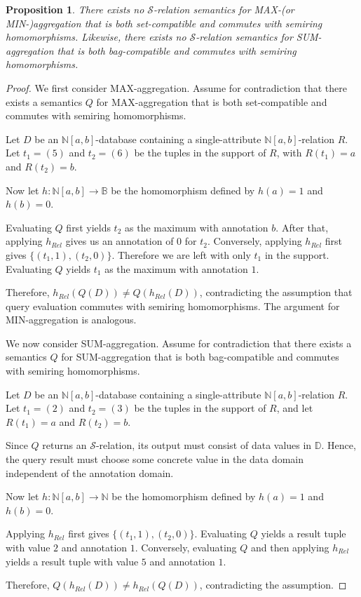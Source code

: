 \documentclass[oneside, 11pt]{amsbook}
\theoremstyle{plain}
\newtheorem{prop}[thm]{Proposition}
\theoremstyle{definition}
\theoremstyle{remark}
\begin{document}
\begin{prop}
    \label{prop:nosemanticsforaggregation}
    There exists no $\mathcal{S}$-relation semantics for MAX-(or MIN-)aggregation that is both set-compatible and commutes with semiring homomorphisms. Likewise, there exists no $\mathcal{S}$-relation semantics for SUM-aggregation that is both bag-compatible and commutes with semiring homomorphisms.
\end{prop}
\begin{proof}
    We first consider MAX-aggregation. Assume for contradiction that there exists a semantics $Q$ for MAX-aggregation that is both set-compatible and commutes with semiring homomorphisms.

    Let $D$ be an $\mathbb{N}[a,b]$-database containing a single-attribute $\mathbb{N}[a,b]$-relation $R$. Let $t_1=(5)$ and $t_2=(6)$ be the tuples in the support of $R$, with $R(t_1)=a$ and $R(t_2)=b$.

    Now let $h: \mathbb{N}[a,b] \to \mathbb{B}$ be the homomorphism defined by $h(a)=1$ and $h(b)=0$.

    Evaluating $Q$ first yields $t_2$ as the maximum with annotation $b$. After that, applying $h_{Rel}$ gives us an annotation of $0$ for $t_2$. Conversely, applying $h_{Rel}$ first gives $\{(t_1, 1), (t_2, 0)\}$. Therefore we are left with only $t_1$ in the support. Evaluating $Q$ yields $t_1$ as the maximum with annotation $1$.

    Therefore, $h_{Rel}(Q(D)) \neq Q(h_{Rel}(D))$, contradicting the assumption that query evaluation commutes with semiring homomorphisms. The argument for MIN-aggregation is analogous.

    We now consider SUM-aggregation. Assume for contradiction that there exists a semantics $Q$ for SUM-aggregation that is both bag-compatible and commutes with semiring homomorphisms.

    Let $D$ be an $\mathbb{N}[a,b]$-database containing a single-attribute $\mathbb{N}[a,b]$-relation $R$. Let $t_1=(2)$ and $t_2=(3)$ be the tuples in the support of $R$, and let $R(t_1)=a$ and $R(t_2)=b$.

    Since $Q$ returns an $\mathcal{S}$-relation, its output must consist of data values in $\mathbb{D}$. Hence, the query result must choose some concrete value in the data domain independent of the annotation domain.

    Now let $h: \mathbb{N}[a,b] \to \mathbb{N}$ be the homomorphism defined by $h(a)=1$ and $h(b)=0$.

    Applying $h_{Rel}$ first gives $\{(t_1, 1), (t_2, 0)\}$. Evaluating $Q$ yields a result tuple with value $2$ and annotation $1$. Conversely, evaluating $Q$ and then applying $h_{Rel}$ yields a result tuple with value $5$ and annotation $1$.

    Therefore, $Q(h_{Rel}(D)) \neq h_{Rel}(Q(D))$, contradicting the assumption.
\end{proof}
\end{document}
